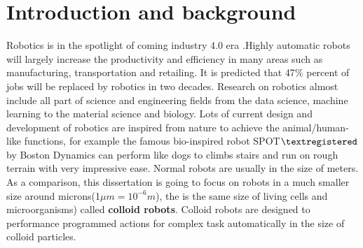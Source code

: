 \chapter{Introduction and background}
Robotics is in the spotlight of coming industry 4.0 era \cite{lasi2014industry}.Highly automatic robots will largely increase the productivity and efficiency in many areas such as manufacturing, transportation and retailing. 
It is predicted that 47$\%$ percent of jobs will be replaced by robotics in two decades. \cite{frey2013future}
Research on robotics almost include all part of science and engineering fields from the data science, machine learning to the material science and biology. Lots of current design and development of robotics are inspired from nature to achieve the animal/human-like functions, for example  the famous  bio-inspired robot SPOT$\textregistered$  by Boston Dynamics \cite{yang2019ten} can perform like dogs  to climbs stairs and run on rough terrain with very impressive ease. Normal robots are usually in the size of meters. As a comparison, this dissertation is going to focus on robots in a much smaller size around microns(1$\mu m=10^{-6} m$), the is the same size of living cells and microorganisms) called \textbf{colloid robots}.
Colloid robots are designed to performance  programmed actions for complex task automatically in the size of colloid particles.

